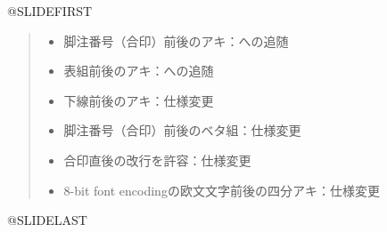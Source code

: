 \documentclass[a4paper,papersize,25pt,slide,dvipdfmx]{jsarticle}
\begin{document}
@SLIDEFIRST
\begin{quote}
\begin{itemize}
  \item 脚注番号（合印）前後のアキ：\pTeX への追随
  \item 表組前後のアキ：\pTeX への追随
  \item 下線前後のアキ：仕様変更
  \item 脚注番号（合印）前後のベタ組：仕様変更
  \item 合印直後の改行を許容：仕様変更
  \item 8-bit font encodingの欧文文字前後の四分アキ：仕様変更
\end{itemize}
\end{quote}
@SLIDELAST
\SLIDEEND
\end{document}
